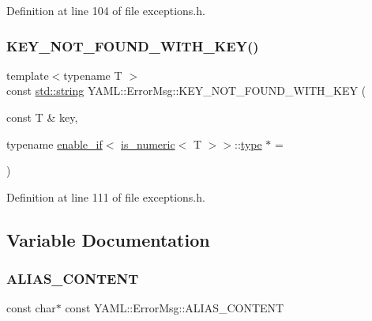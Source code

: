 Definition at line 104 of file exceptions.\+h.

\mbox{\label{namespace_y_a_m_l_1_1_error_msg_a19b61547afc305b9010cf09ab5ff2805}} 
\subsubsection{\texorpdfstring{KEY\_NOT\_FOUND\_WITH\_KEY()}{KEY\_NOT\_FOUND\_WITH\_KEY()}\hspace{0.1cm}{\footnotesize\ttfamily [3/3]}}
{\footnotesize\ttfamily template$<$typename T $>$ \\
const \mbox{\hyperlink{glad_8h_ac83513893df92266f79a515488701770}{std\+::string}} Y\+A\+M\+L\+::\+Error\+Msg\+::\+K\+E\+Y\+\_\+\+N\+O\+T\+\_\+\+F\+O\+U\+N\+D\+\_\+\+W\+I\+T\+H\+\_\+\+K\+EY (\begin{DoxyParamCaption}\item[{const T \&}]{key,  }\item[{typename \mbox{\hyperlink{struct_y_a_m_l_1_1enable__if}{enable\+\_\+if}}$<$ \mbox{\hyperlink{struct_y_a_m_l_1_1is__numeric}{is\+\_\+numeric}}$<$ T $>$$>$\+::\mbox{\hyperlink{glad_8h_a890efa53b3d7deeeced6f3a0d6653ed3}{type}} $\ast$}]{ = {} }\end{DoxyParamCaption})\hspace{0.3cm}{\ttfamily [inline]}}



Definition at line 111 of file exceptions.\+h.



\subsection{Variable Documentation}
\mbox{\label{namespace_y_a_m_l_1_1_error_msg_ac547f96b85b206b119347992e859579e}} 
\subsubsection{\texorpdfstring{ALIAS\_CONTENT}{ALIAS\_CONTENT}}
{\footnotesize\ttfamily const char$\ast$ const Y\+A\+M\+L\+::\+Error\+Msg\+::\+A\+L\+I\+A\+S\+\_\+\+C\+O\+N\+T\+E\+NT}

